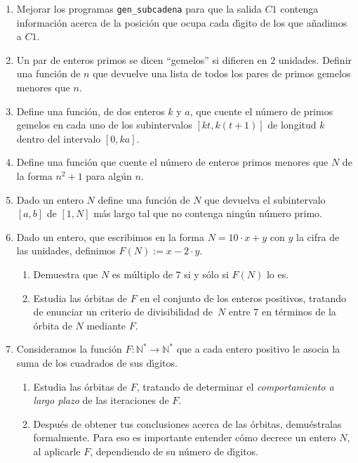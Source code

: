 \begin{enumerate}
\item Mejorar los programas {\tt gen\_subcadena} para que la salida $C1$
contenga
informaci\'on acerca de la posici\'on que ocupa cada d\'{\i}gito de los que
a\~nadimos a $C1.$
 \item Un par de enteros primos se dicen ``gemelos'' si difieren en $2$
unidades. Definir una funci\'on de $n$ que devuelve una lista de todos los pares
de primos gemelos menores que $n$.
 \item Define una funci\'on, de dos enteros $k$ y $a$,  que cuente el n\'umero
de primos gemelos en cada uno de los subintervalos $[kt,k(t+1)]$ de longitud $k$
dentro del intervalo $[0,ka].$
 \item Define una funci\'on que cuente el n\'umero de enteros primos menores que
$N$ de la forma $n^2+1$ para alg\'un $n$.

 \item Dado un entero $N$ define una funci\'on de $N$ que devuelva  el
subintervalo $[a,b]$ de $[1,N]$ m\'as largo tal que no contenga ning\'un
n\'umero primo. 

\item Dado un entero, que escribimos en la forma  $N=10\cdot x+y$ con $y$ la
cifra de las unidades,   definimos $F(N):=x-2\cdot y.$
\begin{enumerate}
\item Demuestra que $N$ es m\'ultiplo de $7$ si y s\'olo si $F(N)$ lo es.
\item Estudia las \'orbitas de $F$ en el conjunto de los enteros positivos,
tratando de enunciar un criterio de divisibilidad de~$N$ entre  $7$ en
t\'erminos de la \'orbita de $N$ mediante $F$.
\end{enumerate} 

\item Consideramos la funci\'on $F:\mathbb{N^*}\to \mathbb{N^*}$ que a cada
entero positivo le asocia la suma de los cuadrados de sus d\'{\i}gitos.
\begin{enumerate}
\item Estudia las \'orbitas de $F$,  tratando de determinar el {\itshape
comportamiento a largo plazo} de las iteraciones de $F$.
\item Despu\'es de obtener tus conclusiones acerca de las \'orbitas,
demu\'estralas formalmente. Para eso es importante entender c\'omo decrece un
entero $N$, al aplicarle $F$, dependiendo de su n\'umero de d\'{\i}gitos.
\end{enumerate} 


\end{enumerate}
